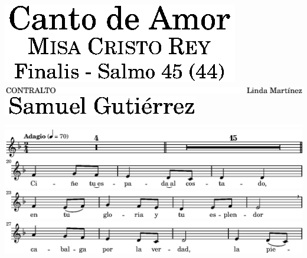 \includegraphics{b0/lily-2159aa8d-1}%
\ifx\betweenLilyPondSystem \undefined
  \linebreak
\else
  \expandafter{}%
\fi
\includegraphics{b0/lily-2159aa8d-2}%
\ifx\betweenLilyPondSystem \undefined
  \linebreak
\else
  \expandafter{}%
\fi
\includegraphics{b0/lily-2159aa8d-3}%
\ifx\betweenLilyPondSystem \undefined
  \linebreak
\else
  \expandafter{}%
\fi
\includegraphics{b0/lily-2159aa8d-4}%
\ifx\betweenLilyPondSystem \undefined
  \linebreak
\else
  \expandafter{}%
\fi
\includegraphics{b0/lily-2159aa8d-5}%
\ifx\betweenLilyPondSystem \undefined
  \linebreak
\else
  \expandafter{}%
\fi
\includegraphics{b0/lily-2159aa8d-6}%
\ifx\betweenLilyPondSystem \undefined
  \linebreak
\else
  \expandafter{}%
\fi
\includegraphics{b0/lily-2159aa8d-7}%
\ifx\betweenLilyPondSystem \undefined
  \linebreak
\else
  \expandafter{}%
\fi
\includegraphics{b0/lily-2159aa8d-8}%
